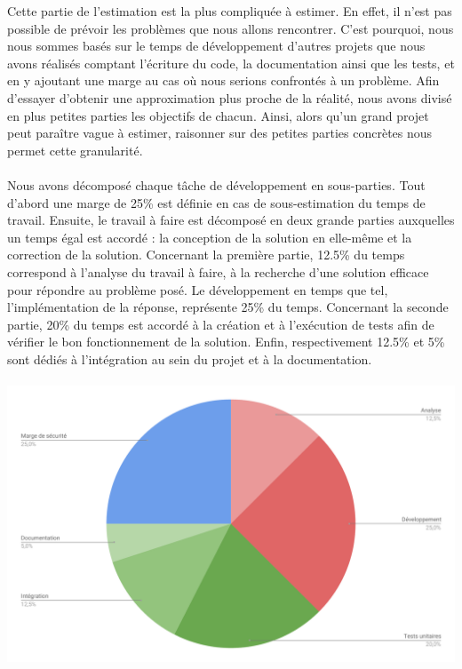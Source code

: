 Cette partie de l’estimation est la plus compliquée à estimer. En effet, il n’est pas possible de prévoir les problèmes que nous allons rencontrer. C’est pourquoi, nous nous sommes basés sur le temps de développement d’autres projets que nous avons réalisés comptant l’écriture du code, la documentation ainsi que les tests, et en y ajoutant une marge au cas où nous serions confrontés à un problème. Afin d’essayer d’obtenir une approximation plus proche de la réalité, nous avons divisé en plus petites parties les objectifs de chacun. Ainsi, alors qu’un grand projet peut paraître vague à estimer, raisonner sur des petites parties concrètes nous permet cette granularité.

\paragraph{}

Nous avons décomposé chaque tâche de développement en sous-parties. Tout d’abord une marge de 25\% est définie en cas de sous-estimation du temps de travail. Ensuite, le travail à faire est décomposé en deux grande parties auxquelles un temps égal est accordé : la conception de la solution en elle-même et la correction de la solution. Concernant la première partie, 12.5\% du temps correspond à l’analyse du travail à faire, à la recherche d’une solution efficace pour répondre au problème posé. Le développement en temps que tel, l’implémentation de la réponse, représente 25\% du temps. Concernant la seconde partie, 20\% du temps est accordé à la création et à l’exécution de tests afin de vérifier le bon fonctionnement de la solution. Enfin, respectivement 12.5\% et 5\% sont dédiés à l’intégration au sein du projet et à la documentation.

\paragraph{}

\begin{mdframed}[frametitle={Figure 1 : Diagramme de répartition du travail par tâche}, innerbottommargin=10]
\begin{center}
\includegraphics[scale=0.44]{repartition_travail_taches.pdf}
\end{center}
\end{mdframed}



